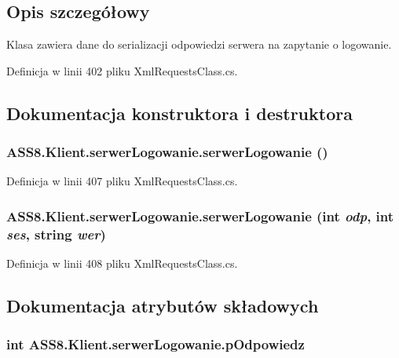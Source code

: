 \subsection{Opis szczegółowy}
Klasa zawiera dane do serializacji odpowiedzi serwera na zapytanie o logowanie. 



Definicja w linii 402 pliku XmlRequestsClass.cs.

\subsection{Dokumentacja konstruktora i destruktora}
\hypertarget{a00025_87dd9f8f0a4c13f2618f3665e0939990}{
\subsubsection[{serwerLogowanie}]{\setlength{\rightskip}{0pt plus 5cm}ASS8.Klient.serwerLogowanie.serwerLogowanie ()}}
\label{d3/dfe/a00025_87dd9f8f0a4c13f2618f3665e0939990}




Definicja w linii 407 pliku XmlRequestsClass.cs.\hypertarget{a00025_2f95f4b70f385acadc411c05487d9a66}{
\subsubsection[{serwerLogowanie}]{\setlength{\rightskip}{0pt plus 5cm}ASS8.Klient.serwerLogowanie.serwerLogowanie (int {\em odp}, \/  int {\em ses}, \/  string {\em wer})}}
\label{d3/dfe/a00025_2f95f4b70f385acadc411c05487d9a66}




Definicja w linii 408 pliku XmlRequestsClass.cs.

\subsection{Dokumentacja atrybutów składowych}
\hypertarget{a00025_45258daf05e76c2327ba5d5040095c2c}{
\subsubsection[{pOdpowiedz}]{\setlength{\rightskip}{0pt plus 5cm}int {\bf ASS8.Klient.serwerLogowanie.pOdpowiedz}}}
\label{d3/dfe/a00025_45258daf05e76c2327ba5d5040095c2c}




